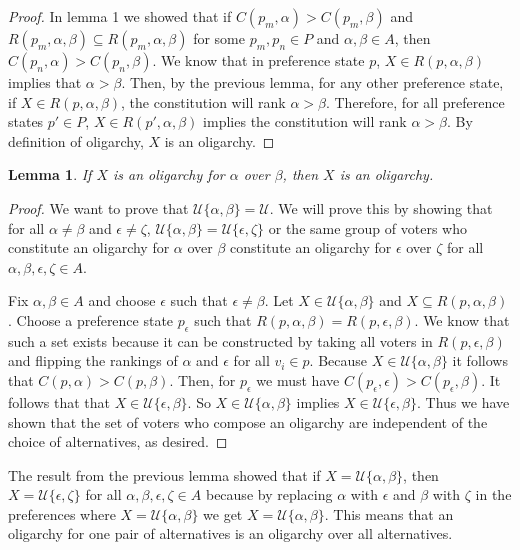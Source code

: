 \documentclass{amsart}
\newtheorem{lemma}{Lemma}
\theoremstyle{plain}
\begin{document}
\begin{proof}
    In lemma 1 we showed that if $C(p_m, \alpha) > C(p_m, \beta)$ and $R(p_m, \alpha, \beta) \subseteq R(p_m, \alpha, \beta)$ for some $p_m, p_n \in P$ and $\alpha, \beta \in A$, then $C(p_n, \alpha) > C(p_n, \beta)$. We know that in preference state $p$, $X \in R(p, \alpha, \beta)$ implies that $\alpha > \beta$. Then, by the previous lemma, for any other preference state, if $X \in R(p, \alpha, \beta)$, the constitution will rank $\alpha > \beta$. Therefore, for all preference states $p' \in P$, $X \in R(p', \alpha, \beta)$ implies the constitution will rank $\alpha > \beta$. By definition of oligarchy, $X$ is an oligarchy. 
\end{proof}

\begin{lemma}
    If $X$ is an oligarchy for $\alpha$ over $\beta$, then $X$ is an oligarchy.
\end{lemma}

\begin{proof}
    We want to prove that $\mathcal{U}\{\alpha, \beta\} = \mathcal{U}$. We will prove this by showing that for all $\alpha \ne \beta$ and $\epsilon \ne \zeta$, $\mathcal{U}\{\alpha, \beta\} = \mathcal{U}\{\epsilon, \zeta\}$ or the same group of voters who constitute an oligarchy for $\alpha$ over $\beta$ constitute an oligarchy for $\epsilon$ over $\zeta$ for all $\alpha, \beta, \epsilon, \zeta \in A$.
    
    Fix $\alpha, \beta \in A$ and choose $\epsilon$ such that $\epsilon \ne \beta$. Let $X \in \mathcal{U}\{\alpha, \beta\}$ and $X \subseteq R(p, \alpha, \beta)$. Choose a preference state $p_{\epsilon}$ such that $R(p, \alpha, \beta) = R(p, \epsilon, \beta)$. We know that such a set exists because it can be constructed by taking all voters in  $R(p, \epsilon, \beta)$ and flipping the rankings of $\alpha$ and $\epsilon$ for all $v_i \in p$. Because $X \in \mathcal{U}\{\alpha, \beta\}$ it follows that $C(p, \alpha) > C(p, \beta)$. Then, for $p_{\epsilon}$ we must have $C(p_{\epsilon}, \epsilon) > C(p_{\epsilon}, \beta)$. It follows that that $X \in \mathcal{U}\{\epsilon, \beta\}$. So $X \in \mathcal{U}\{\alpha, \beta\}$ implies $X \in \mathcal{U}\{\epsilon, \beta\}$. Thus we have shown that the set of voters who compose an oligarchy are independent of the choice of alternatives, as desired. 
\end{proof}

The result from the previous lemma showed that if $X = \mathcal{U}\{\alpha, \beta\}$, then $X = \mathcal{U}\{\epsilon, \zeta\}$ for all $\alpha, \beta, \epsilon, \zeta \in A$ because by replacing $\alpha$ with $\epsilon$ and $\beta$ with $\zeta$ in the preferences where $X = \mathcal{U}\{\alpha, \beta\}$ we get $X = \mathcal{U}\{\alpha, \beta\}$. This means that an oligarchy for one pair of alternatives is an oligarchy over all alternatives.
\end{document}

